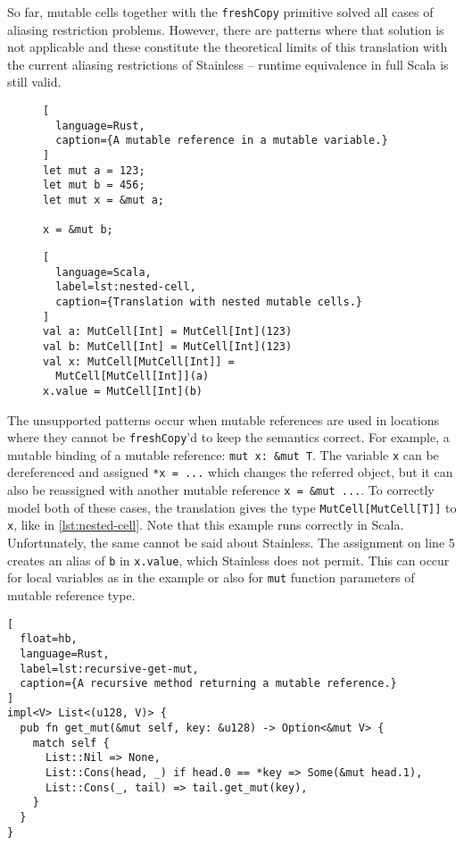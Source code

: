 So far, mutable cells together with the \lstinline!freshCopy! primitive solved
all cases of aliasing restriction problems. However, there are patterns where
that solution is not applicable and these constitute the theoretical limits of
this translation with the current aliasing restrictions of Stainless -- runtime
equivalence in full Scala is still valid.

\begin{figure}
\noindent\begin{minipage}[t]{.35\textwidth}
\begin{lstlisting}[
  language=Rust,
  caption={A mutable reference in a mutable variable.}
]
let mut a = 123;
let mut b = 456;
let mut x = &mut a;

x = &mut b;
\end{lstlisting}
\end{minipage}\hfill
\begin{minipage}[t]{.6\textwidth}
\begin{lstlisting}[
  language=Scala,
  label=lst:nested-cell,
  caption={Translation with nested mutable cells.}
]
val a: MutCell[Int] = MutCell[Int](123)
val b: MutCell[Int] = MutCell[Int](123)
val x: MutCell[MutCell[Int]] =
  MutCell[MutCell[Int]](a)
x.value = MutCell[Int](b)
\end{lstlisting}
\end{minipage}
\end{figure}

The unsupported patterns occur when mutable references are used in locations
where they cannot be \lstinline!freshCopy!'d to keep the semantics correct. For
example, a mutable binding of a mutable reference: \passthrough{\lstinline!mut
x: &mut T!}. The variable \lstinline!x! can be dereferenced and assigned
\lstinline!*x = ...! which changes the referred object, but it can also be
reassigned with another mutable reference \lstinline!x = &mut ...!. To correctly
model both of these cases, the translation gives the type
\lstinline!MutCell[MutCell[T]]! to \lstinline!x!, like in
\autoref{lst:nested-cell}. Note that this example runs correctly in Scala.
Unfortunately, the same cannot be said about Stainless. The assignment on line 5
creates an alias of \lstinline!b! in \lstinline!x.value!, which Stainless does
not permit. This can occur for local variables as in the example or also for
\lstinline!mut! function parameters of mutable reference type.

\begin{lstlisting}[
  float=hb,
  language=Rust,
  label=lst:recursive-get-mut,
  caption={A recursive method returning a mutable reference.}
]
impl<V> List<(u128, V)> {
  pub fn get_mut(&mut self, key: &u128) -> Option<&mut V> {
    match self {
      List::Nil => None,
      List::Cons(head, _) if head.0 == *key => Some(&mut head.1),
      List::Cons(_, tail) => tail.get_mut(key),
    }
  }
}
\end{lstlisting}

